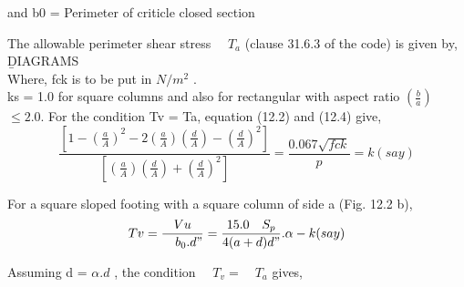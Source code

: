 \documentclass{book}
\begin{document}
and b0 = Perimeter of criticle closed section
\par The allowable perimeter shear stress
$\quad{T_a}$  
(clause 31.6.3 of the code) is given by,
\newpage
\b DIAGRAMS \\ 
Where, fck is to be put in $N/m^2$ .\\
 ks = 1.0 for square columns and also for rectangular with aspect ratio  $\left( \frac{b}{a} \right)$ $\leq {2.0}$. For the condition Tv = Ta, equation (12.2) and (12.4) give,
\begin{equation}
\frac{\left[1-\left( \frac{a}{A} \right)^2-2\left(\frac{a}{A}\right)\left(\frac{d}{A}\right)-\left(\frac{d}{A} \right)^2 \right]}
{\left[\left(\frac{a}{A}\right)\left(\frac{d}{A}\right)+\left(\frac{d}{A}\right)^2 \right]}
=\frac{0.067\sqrt{fck}}{p}
=k(say)
\end{equation}

 For a square sloped footing with a square column of side a (Fig. 12.2 b),
\begin{equation}
Tv=\frac{Vu}{\quad{b_0}.d "}
=\frac{15.0\quad{S_p}}{4(a+d)d"}.\alpha-k(say)
\end{equation}

Assuming d = $\alpha.d$ , the condition $\quad{T_v}=\quad{T_a}$  gives,
\end{document}
